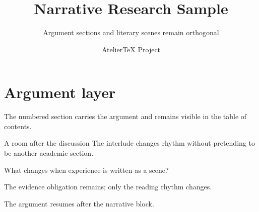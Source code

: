 \documentclass[profile=narrative]{atelier}
\title{Narrative Research Sample}
\subtitle{Argument sections and literary scenes remain orthogonal}
\author{AtelierTeX Project}
\begin{document}
\maketitle

\section{Argument layer}
The numbered section carries the argument and remains visible in the table of contents.

\begin{AtelierInterlude}{A room after the discussion}
The interlude changes rhythm without pretending to be another academic section.
\end{AtelierInterlude}

\begin{AtelierDialogue}
What changes when experience is written as a scene?

The evidence obligation remains; only the reading rhythm changes.
\end{AtelierDialogue}

\AtelierSceneBreak

The argument resumes after the narrative block.
\end{document}
